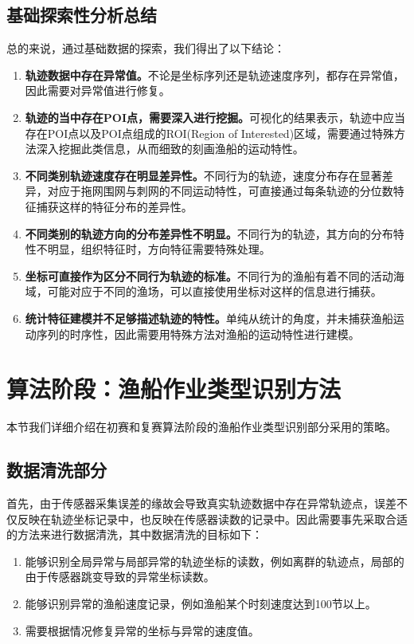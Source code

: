 \documentclass[UTF8, 12pt]{ctexart}
\begin{document}
	\subsection{基础探索性分析总结}
	总的来说，通过基础数据的探索，我们得出了以下结论：
	\begin{enumerate}
		\item \textbf{轨迹数据中存在异常值。}不论是坐标序列还是轨迹速度序列，都存在异常值，因此需要对异常值进行修复。
		\item \textbf{轨迹的当中存在POI点，需要深入进行挖掘。}可视化的结果表示，轨迹中应当存在POI点以及POI点组成的ROI(Region of Interested)区域，需要通过特殊方法深入挖掘此类信息，从而细致的刻画渔船的运动特性。
		\item \textbf{不同类别轨迹速度存在明显差异性。}不同行为的轨迹，速度分布存在显著差异，对应于拖网围网与刺网的不同运动特性，可直接通过每条轨迹的分位数特征捕获这样的特征分布的差异性。
		\item \textbf{不同类别的轨迹方向的分布差异性不明显。}不同行为的轨迹，其方向的分布特性不明显，组织特征时，方向特征需要特殊处理。
		\item \textbf{坐标可直接作为区分不同行为轨迹的标准。}不同行为的渔船有着不同的活动海域，可能对应于不同的渔场，可以直接使用坐标对这样的信息进行捕获。
		\item \textbf{统计特征建模并不足够描述轨迹的特性。}单纯从统计的角度，并未捕获渔船运动序列的时序性，因此需要用特殊方法对渔船的运动特性进行建模。
	\end{enumerate}

	\section{算法阶段：渔船作业类型识别方法}\label{sec_2}
		本节我们详细介绍在初赛和复赛算法阶段的渔船作业类型识别部分采用的策略。

		\subsection{数据清洗部分}
		首先，由于传感器采集误差的缘故会导致真实轨迹数据中存在异常轨迹点，误差不仅反映在轨迹坐标记录中，也反映在传感器读数的记录中。因此需要事先采取合适的方法来进行数据清洗，其中数据清洗的目标如下：
		\begin{enumerate}
			\item 能够识别全局异常与局部异常的轨迹坐标的读数，例如离群的轨迹点，局部的由于传感器跳变导致的异常坐标读数。
			\item 能够识别异常的渔船速度记录，例如渔船某个时刻速度达到100节以上。
			\item 需要根据情况修复异常的坐标与异常的速度值。
		\end{enumerate}
\end{document}

